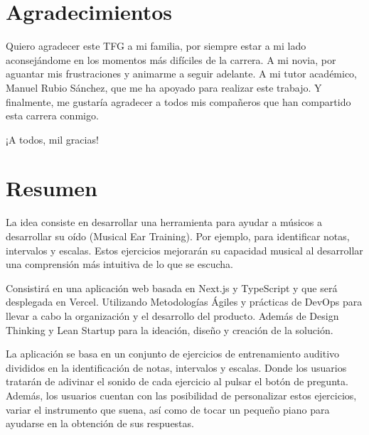 \documentclass[12pt,twoside,titlepage]{report}
\newcommand\blankpage{%
    \newpage
    \null
    \thispagestyle{empty}%
    \newpage}
\begin{document}
\hypersetup{pageanchor=true}
\normalsize
\afterpage{\blankpage}
 
\setlength{\parskip}{0.75em}
\renewcommand{\baselinestretch}{1.25}

\setcounter{page}{2}


 

\chapter*{Agradecimientos}

Quiero agradecer este TFG a mi familia, por siempre estar a mi lado aconsejándome en los momentos más difíciles de la carrera. 
A mi novia, por aguantar mis frustraciones y animarme a seguir adelante. 
A mi tutor académico, Manuel Rubio Sánchez, que me ha apoyado para realizar este trabajo. 
Y finalmente, me gustaría agradecer a todos mis compañeros que han compartido esta carrera conmigo.

¡A todos, mil gracias!
\afterpage{\blankpage}


 

\chapter*{Resumen}
La idea consiste en desarrollar una herramienta para ayudar a músicos a desarrollar su oído (Musical Ear Training). Por ejemplo, para identificar notas, intervalos y escalas. Estos ejercicios mejorarán su capacidad musical al desarrollar una comprensión más intuitiva de lo que se escucha.

Consistirá en una aplicación web basada en Next.js y TypeScript y que será desplegada en Vercel. Utilizando Metodologías Ágiles y prácticas de DevOps para llevar a cabo la organización y el desarrollo del producto. Además de Design Thinking y Lean Startup para la ideación, diseño y creación de la solución.

La aplicación se basa en un conjunto de ejercicios de entrenamiento auditivo divididos en la identificación de notas, intervalos y escalas. Donde los usuarios tratarán de adivinar el sonido de cada ejercicio al pulsar el botón de pregunta. Además, los usuarios cuentan con las posibilidad de personalizar estos ejercicios, variar el instrumento que suena, así como de tocar un pequeño piano para ayudarse en la obtención de sus respuestas.
\end{document}
